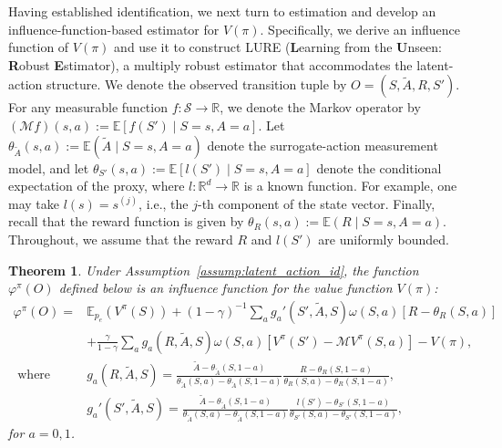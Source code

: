 \documentclass[12pt]{article}
\newcommand{\0}{\boldsymbol{0}}
\newtheorem{theorem}{Theorem}
\newcommand{\E}{\mathbb{E}}
\begin{document}
Having established identification, we next turn to estimation and develop an influence-function-based estimator for $V(\pi)$. Specifically, we derive an influence function of $V(\pi)$ and use it to construct LURE (\textbf{L}earning from the \textbf{U}nseen: \textbf{R}obust \textbf{E}stimator), a multiply robust estimator that accommodates the latent-action structure.
We denote the observed transition tuple by \(O=(S,\widetilde A,R,S')\).  For any measurable function $f:\mathcal{S}\to\mathbb{R}$, we denote the Markov operator by
$(\mathcal{M}f)(s,a):=\E\!\left[f(S')\mid S=s, A=a\right].$
Let \(\theta_{\widetilde A}(s,a) := \E(\widetilde A \mid S=s, A=a)\) denote the surrogate-action measurement model, and let \(\theta_{S'}(s,a) := \E\left[l(S') \mid S=s, A=a\right]\) denote the conditional expectation of the proxy, where \(l:\mathbb{R}^d \to \mathbb{R}\) is a known function.  For example, one may take \(l(s) = s^{(j)}\), i.e., the $j$-th component of the state vector. 
Finally, recall that the reward function is given by \(\theta_R(s,a) := \E(R \mid S=s, A=a)\). Throughout, we assume that the reward $R$ and $l(S')$ are uniformly bounded. 



\begin{theorem}\label{thm:influence_function}
Under Assumption~\ref{assump:latent_action_id}, the function $\varphi^\pi(O)$ defined below is an influence function for the value function $V(\pi)$: 
    \begin{align}\label{eq:IF}
        \nonumber \varphi^\pi(O)=&\E_{p_e} (V^\pi(S))+(1-\gamma)^{-1}\sum_a  g_{a}' (S',\widetilde A,S) \omega(S,a) \left[ R-\theta_R(S,a) \right]\\
        &+\frac{\gamma}{1-\gamma}\sum_a  g_{a} (R,\widetilde A,S) \omega(S,a) \left[ V^\pi(S')-\mathcal{M}V^\pi(S,a)  \right]-V(\pi), \\
  \text{ where } 
   \nonumber & g_{a}(R,\widetilde A,S) =  \frac{\widetilde A-\theta_{\widetilde A}(S,1-a)}{\theta_{\widetilde A}(S,a)-\theta_{\widetilde A}(S,1-a)} \frac{R-\theta_{R}(S,1-a)}{\theta_{R}(S,a)-\theta_{R}(S,1-a)},\\
 \nonumber & g_{a}'(S',\widetilde A,S) =  \frac{\widetilde A-\theta_{\widetilde A}(S,1-a)}{\theta_{\widetilde A}(S,a)-\theta_{\widetilde A}(S,1-a)} \frac{l(S')-\theta_{S'}(S,1-a)}{\theta_{S'}(S,a)-\theta_{S'}(S,1-a)},
\end{align} for $a=0,1$.
\end{theorem}
\end{document}
